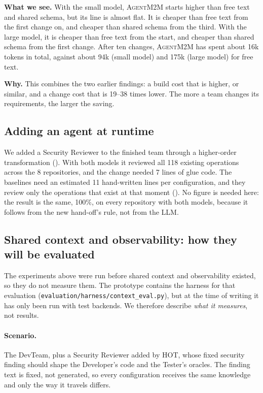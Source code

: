 \documentclass[10pt,a4paper]{article}
\newcommand{\tool}{\textsc{AgentM2M}}
\newcommand{\file}[1]{\texttt{#1}}
\theoremstyle{definition}
\begin{document}
\noindent\textbf{What we see.} With the small model, \tool{} starts higher
than free text and shared schema, but its line is almost flat. It is
cheaper than free text from the first change on, and cheaper than shared
schema from the third. With the large model, it is cheaper than free text
from the start, and cheaper than shared schema from the first change. After
ten changes, \tool{} has spent about 16k tokens in total, against about 94k
(small model) and 175k (large model) for free text.

\noindent\textbf{Why.} This combines the two earlier findings: a build cost
that is higher, or similar, and a change cost that is 19--38 times lower. The
more a team changes its requirements, the larger the saving.

\subsection{Adding an agent at runtime}

We added a Security Reviewer to the finished team through a higher-order
transformation (). With both models it reviewed all 118 existing
operations across the 8 repositories, and the change needed 7 lines of glue
code. The baselines need an estimated 11 hand-written lines per
configuration, and they review only the operations that exist at that moment
(). No figure is needed here: the result is the same, 100\%,
on every repository with both models, because it follows from the new
hand-off's rule, not from the LLM.

\subsection{Shared context and observability: how they will be evaluated}\label{sec:ctx-eval}

The experiments above were run before shared context and observability
existed, so they do not measure them. The prototype contains the harness for
that evaluation (\file{evaluation/harness/context\_eval.py}), but at the time
of writing it has only been run with test backends. We therefore describe
\emph{what it measures}, not results.

\paragraph{Scenario.} The DevTeam, plus a Security Reviewer added by HOT,
whose fixed security finding should shape the Developer's code and the
Tester's oracles. The finding text is fixed, not generated, so every
configuration receives the same knowledge and only the way it travels differs.
\end{document}

